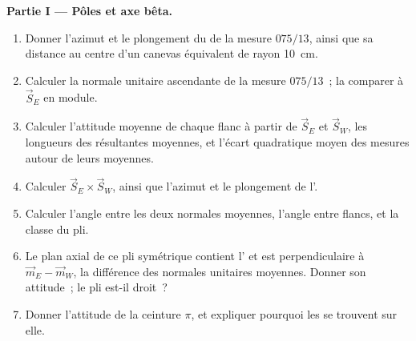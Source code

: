 \begin{problem}
\medskip\noindent\textbf{Partie I --- Pôles et axe bêta.}
\begin{enumerate}
  \item Donner l'azimut et le plongement du  de la mesure $075/13$, ainsi que
        sa distance au centre d'un canevas équivalent de rayon
        \qty{10}{cm}.
  \item Calculer la normale unitaire ascendante de la mesure $075/13$~; la comparer
        à $\vec S_E$ en module.
  \item Calculer l'attitude moyenne de chaque flanc à partir de $\vec S_E$ et $\vec S_W$,
        les longueurs des résultantes moyennes, et l'écart quadratique moyen des
        mesures autour de leurs moyennes.
  \item Calculer $\vec S_E\times\vec S_W$, ainsi que l'azimut et le plongement
        de l'.
  \item Calculer l'angle entre les deux normales moyennes, l'angle entre flancs,
        et la classe du pli.
  \item Le plan axial de ce pli symétrique contient l' et est
        perpendiculaire à $\vec m_E - \vec m_W$, la différence des normales unitaires
        moyennes. Donner son attitude~; le pli est-il droit~?
  \item Donner l'attitude de la ceinture $\pi$, et expliquer pourquoi les  se trouvent
        sur elle.
\end{enumerate}


\end{problem}
